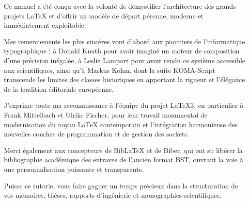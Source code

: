 
Ce manuel a été conçu avec la volonté de démystifier l'architecture des grands projets \LaTeX{}
et d'offrir un modèle de départ pérenne, moderne et immédiatement exploitable.

Mes remerciements les plus sincères vont d'abord aux pionniers de l'informatique typographique :
à Donald Knuth pour avoir imaginé un moteur de composition d'une précision inégalée,
à Leslie Lamport pour avoir rendu ce système accessible aux scientifiques,
ainsi qu'à Markus Kohm, dont la suite KOMA-Script transcende les limites des classes historiques
en apportant la rigueur et l'élégance de la tradition éditoriale européenne.

J'exprime toute ma reconnaissance à l'équipe du projet \LaTeX3,
en particulier à Frank Mittelbach et Ulrike Fischer,
pour leur travail monumental de modernisation du noyau \LaTeX{} contemporain
et l'intégration harmonieuse des nouvelles couches de programmation et de gestion des sockets.

Merci également aux concepteurs de Bib\LaTeX{} et de Biber,
qui ont su libérer la bibliographie académique des entraves de l'ancien format BST,
ouvrant la voie à une personnalisation puissante et transparente.

Puisse ce tutoriel vous faire gagner un temps précieux dans la structuration de vos mémoires,
thèses, rapports d'ingénierie et monographies scientifiques.
